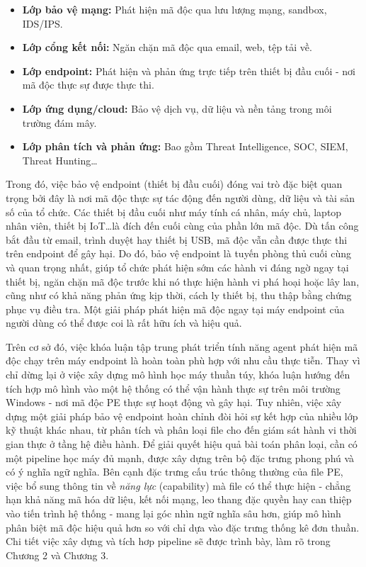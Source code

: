 \begin{itemize}
	\item \textbf{Lớp bảo vệ mạng:} Phát hiện mã độc qua lưu
	lượng mạng, sandbox, IDS/IPS.

	\item \textbf{Lớp cổng kết nối:} Ngăn chặn mã độc qua email,
	web, tệp tải về.

	\item \textbf{Lớp endpoint:} Phát hiện và phản ứng trực tiếp
	trên thiết bị đầu cuối - nơi mã độc thực sự được thực thi.

	\item \textbf{Lớp ứng dụng/cloud:} Bảo vệ dịch vụ, dữ liệu
	và nền tảng trong môi trường đám mây.

	\item \textbf{Lớp phân tích và phản ứng:} Bao gồm Threat
	Intelligence, SOC, SIEM, Threat Hunting\dots
\end{itemize}

Trong đó, việc bảo vệ endpoint (thiết bị đầu cuối) \cite{wikiendpointsecurity} đóng vai
trò đặc biệt quan trọng bởi đây là nơi mã độc thực sự tác động
đến người dùng, dữ liệu và tài sản số của tổ chức. Các thiết bị
đầu cuối như máy tính cá nhân, máy chủ, laptop nhân viên, thiết
bị IoT\dots là đích đến cuối cùng của phần lớn mã độc. Dù tấn
công bắt đầu từ email, trình duyệt hay thiết bị USB, mã độc vẫn
cần được thực thi trên endpoint để gây hại. Do đó, bảo vệ
endpoint là tuyến phòng thủ cuối cùng và quan trọng nhất, giúp
tổ chức phát hiện sớm các hành vi đáng ngờ ngay tại thiết bị,
ngăn chặn mã độc trước khi nó thực hiện hành vi phá hoại hoặc
lây lan, cũng như có khả năng phản ứng kịp thời, cách ly thiết
bị, thu thập bằng chứng phục vụ điều tra. Một giải pháp phát
hiện mã độc ngay tại máy endpoint của người dùng có thể được
coi là rất hữu ích và hiệu quả.

Trên cơ sở đó, việc khóa luận tập trung phát triển tính năng
agent phát hiện mã độc chạy trên máy endpoint là hoàn toàn phù hợp
với nhu cầu thực tiễn. Thay vì chỉ dừng lại ở việc xây dựng mô hình
học máy thuần túy, khóa luận hướng đến tích hợp mô hình vào một hệ
thống có thể vận hành thực sự trên môi trường Windows - nơi mã độc
PE thực sự hoạt động và gây hại. Tuy nhiên, việc xây dựng một giải pháp bảo vệ endpoint hoàn chỉnh
đòi hỏi sự kết hợp của nhiều lớp kỹ thuật khác nhau, từ phân tích
và phân loại file cho đến giám sát hành vi thời gian thực ở tầng hệ
điều hành. Để giải quyết hiệu quả bài toán phân loại, cần có một
pipeline học máy đủ mạnh, được xây dựng trên bộ đặc trưng phong phú
và có ý nghĩa ngữ nghĩa. Bên cạnh đặc trưng cấu trúc thông thường
của file PE, việc bổ sung thông tin về \textit{năng lực} (capability)
mà file có thể thực hiện - chẳng hạn khả năng mã hóa dữ liệu, kết
nối mạng, leo thang đặc quyền hay can thiệp vào tiến trình hệ thống
- mang lại góc nhìn ngữ nghĩa sâu hơn, giúp mô hình phân biệt mã
độc hiệu quả hơn so với chỉ dựa vào đặc trưng thống kê đơn thuần.
Chi tiết việc xây dựng và tích hơp pipeline sẽ được trình bày,
làm rõ trong Chương 2 và Chương 3.






